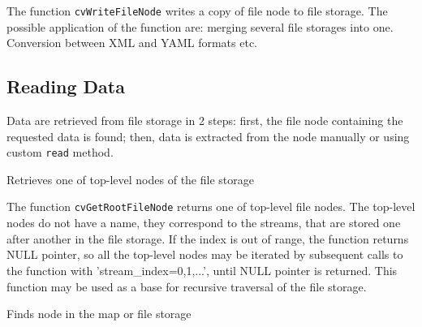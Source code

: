 The function \texttt{cvWriteFileNode} writes a copy of file node to file storage. The possible application of the function are: merging several file storages into one. Conversion between XML and YAML formats etc.

\subsection{Reading Data}

Data are retrieved from file storage in 2 steps: first, the file node
containing the requested data is found; then, data is extracted from
the node manually or using custom \texttt{read} method.

\label{GetRootFileNode}

Retrieves one of top-level nodes of the file storage


\begin{description}
\end{description}

The function \texttt{cvGetRootFileNode} returns one of top-level file
nodes. The top-level nodes do not have a name, they correspond to the
streams, that are stored one after another in the file storage. If the
index is out of range, the function returns NULL pointer, so all the
top-level nodes may be iterated by subsequent calls to the function with
'stream\_index=0,1,...', until NULL pointer is returned. This function
may be used as a base for recursive traversal of the file storage.

\label{GetFileNodeByName}

Finds node in the map or file storage


